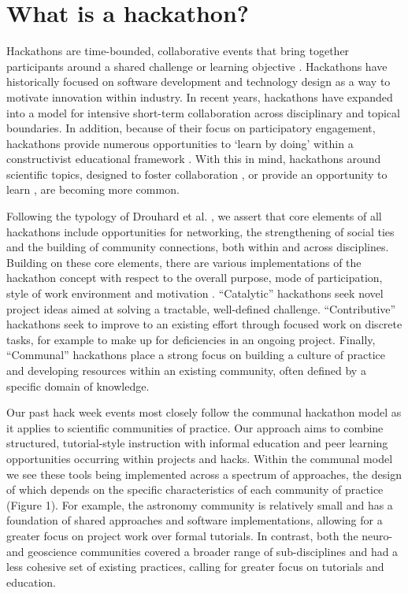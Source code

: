 \section*{What is a hackathon?}

Hackathons are time-bounded, collaborative events that bring together participants around a shared challenge or learning objective \cite{Decker2015}.
Hackathons have historically focused on software development and technology design as a way to motivate innovation within industry.
In recent years, hackathons have expanded into a model for intensive short-term collaboration across disciplinary and topical boundaries.
In addition, because of their focus on participatory engagement, hackathons provide numerous opportunities to `learn by doing' within a constructivist educational framework \cite{Bransford2000-lu,Papert1980-fh}.
With this in mind, hackathons around scientific topics, designed to foster collaboration \cite{Groen2015-cj,Moller2013-ah}, or provide an opportunity to learn \cite{Kienzler2015-zu,Lamers2014-xf}, are becoming more common.

Following the typology of Drouhard et al. \cite{Drouhard2017}, we assert that core elements of all hackathons include opportunities for networking, the strengthening of social ties and the building of community connections, both within and across disciplines.
Building on these core elements, there are various implementations of the hackathon concept with respect to the overall purpose, mode of participation, style of work environment and motivation \cite{Drouhard2017}.
``Catalytic'' hackathons seek novel project ideas aimed at solving a tractable, well-defined challenge.
``Contributive'' hackathons seek to improve to an existing effort through focused work on discrete tasks, for example to make up for deficiencies in an ongoing project.
Finally, ``Communal'' hackathons place a strong focus on building a culture of practice and developing resources within an existing community, often defined by a specific domain of knowledge.

Our past hack week events most closely follow the communal hackathon model as it applies to scientific communities of practice.
Our approach aims to combine structured, tutorial-style instruction with informal education and peer learning opportunities occurring within projects and hacks.
Within the communal model we see these tools being implemented across a spectrum of approaches, the design of which depends on the specific characteristics of each community of practice (Figure 1).
For example, the astronomy community is relatively small and has a foundation of shared approaches and software implementations, allowing for a greater focus on project work over formal tutorials.
In contrast, both the neuro- and geoscience communities covered a broader range of sub-disciplines and had a less cohesive set of existing practices, calling for greater focus on tutorials and education.

